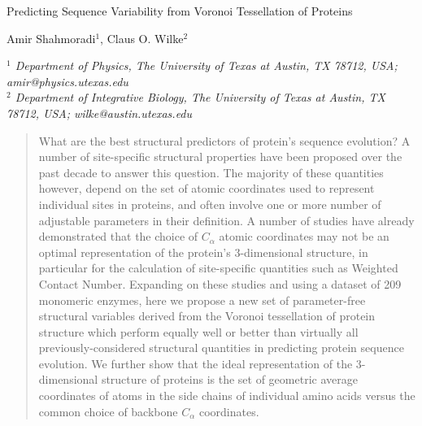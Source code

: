 \documentclass[11pt]{article}
\makeatletter
\newcommand\pubnumber{}
\newcommand\pubdate{\today}
\def\affiliation{$^1$ Department of Physics, The University of Texas at Austin, TX 78712, USA; amir@physics.utexas.edu \\
                 $^2$ Department of Integrative Biology, The University of Texas at Austin, TX 78712, USA; wilke@austin.utexas.edu
                 }
\def\Title#1{\begin{center} {\Large #1 } \end{center}}
\def\Author#1{\begin{center}{ \sc #1} \end{center}}
\def\Address#1{\begin{center}{ \it #1} \end{center}}
\newcommand\pubblock{\rightline{\begin{tabular}{l} \pubnumber\\
         \pubdate  \end{tabular}}}
\newenvironment{Abstract}{\begin{quotation}  }{\end{quotation}}
\makeatother
\begin{document}
\begin{titlepage}
\pubblock

\vfill
\Title{Predicting Sequence Variability from Voronoi Tessellation of Proteins}
\vfill
\Author{Amir Shahmoradi$^{1}$, Claus O. Wilke$^2$}
\Address{\affiliation}
\vfill
\begin{Abstract}
    What are the best structural predictors of protein's sequence evolution? A number of site-specific structural properties have been proposed over the past decade to answer this question. The majority of these quantities however, depend on the set of atomic coordinates used to represent individual sites in proteins, and often involve one or more number of adjustable parameters in their definition. A number of studies have already demonstrated that the choice of $C_\alpha$ atomic coordinates may not be an optimal representation of the protein's 3-dimensional structure, in particular for the calculation of site-specific quantities such as Weighted Contact Number.  Expanding on these studies and using a dataset of 209 monomeric enzymes, here we propose a new set of parameter-free structural variables derived from the Voronoi tessellation of protein structure which perform equally well or better than virtually all previously-considered structural quantities in predicting protein sequence evolution. We further show that the ideal representation of the 3-dimensional structure of proteins is the set of geometric average coordinates of atoms in the side chains of individual amino acids versus the common choice of backbone $C_\alpha$ coordinates.

\end{Abstract}
\end{titlepage}
\end{document}
